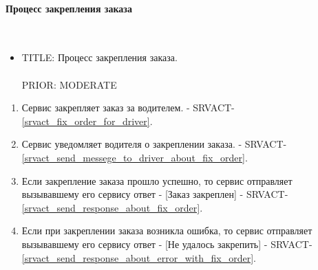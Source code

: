     \paragraph{Процесс закрепления заказа} \mbox{} \\

        \begin{itemize}

	        \item {
	          TITLE: Процесс закрепления заказа.\\
	          \\
	          PRIOR: MODERATE\\
	        }

     	   \end{itemize}

        \begin{alg} \label{alg_order_fastening} \mbox{}

	        \begin{enumerate}

	          \item Сервис закрепляет заказ за водителем. - SRVACT-\ref{srvact_fix_order_for_driver}.

	          \item Сервис уведомляет водителя о закреплении заказа. - SRVACT-\ref{srvact_send_messege_to_driver_about_fix_order}.
	          
	          \item Если закрепление заказа прошло успешно, то сервис отправляет вызывавшему его сервису ответ - [Заказ закреплен] -  SRVACT-\ref{srvact_send_response_about_fix_order}. 

	          \item Если при закреплении заказа возникла ошибка, то сервис отправляет вызывавшему его сервису ответ - [Не удалось закрепить] - SRVACT-\ref{srvact_send_response_about_error_with_fix_order}. 
	        \end{enumerate}

        	\end{alg}

